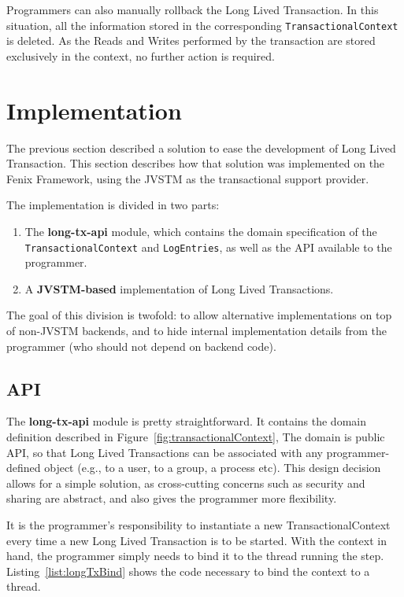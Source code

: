 Programmers can also manually rollback the Long Lived Transaction. In
this situation, all the information stored in the corresponding
\texttt{TransactionalContext} is deleted. As the Reads and Writes
performed by the transaction are stored exclusively in the context, no
further action is required.

\section{Implementation}
\label{sec:impl}


The previous section described a solution to ease the development of
Long Lived Transaction. This section describes how that solution was
implemented on the Fenix Framework, using the JVSTM as the
transactional support provider.

The implementation is divided in two parts:

\begin{enumerate}

\item The {\bf long-tx-api} module, which contains the domain
  specification of the \texttt{TransactionalContext} and
  \texttt{LogEntries}, as well as the API available to the programmer.

\item A {\bf JVSTM-based} implementation of Long Lived Transactions.
\end{enumerate}

The goal of this division is twofold: to allow alternative
implementations on top of non-JVSTM backends, and to hide internal
implementation details from the programmer (who should not depend on
backend code).

\subsection{API}

The {\bf long-tx-api} module is pretty straightforward. It contains
the domain definition described in
Figure~\ref{fig:transactionalContext}, The domain is public API, so
that Long Lived Transactions can be associated with any
programmer-defined object (e.g., to a user, to a group, a process
etc). This design decision allows for a simple solution, as
cross-cutting concerns such as security and sharing are abstract, and
also gives the programmer more flexibility.

It is the programmer's responsibility to instantiate a new
TransactionalContext every time a new Long Lived Transaction is to be
started. With the context in hand, the programmer simply needs to bind
it to the thread running the step. Listing~\ref{list:longTxBind} shows
the code necessary to bind the context to a thread.

